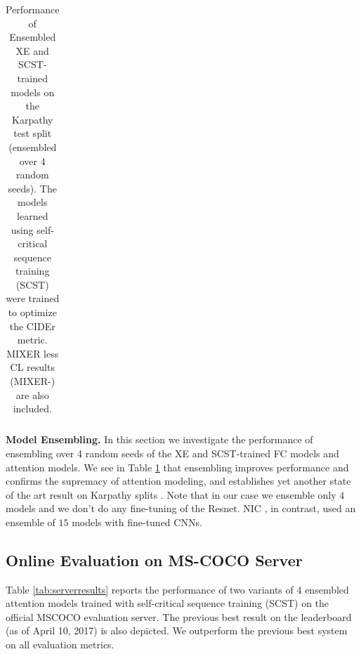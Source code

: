 \documentclass[10pt,twocolumn,letterpaper]{article}
\begin{document}
\begin{table}[t]
\begin{tabular}{l|c|cccc}
\hline
\hline
\end{tabular}
\caption{Performance of Ensembled XE and SCST-trained models on the Karpathy test split (ensembled over 4 random seeds). The models learned using self-critical sequence training (SCST) were trained to optimize the CIDEr metric. MIXER less CL results (MIXER-) are also included.}%
\label{tab:EnsembleFcVsAtt}
\end{table}

\noindent \textbf{Model Ensembling.} In this section we investigate the performance of ensembling over 4 random seeds of the XE and SCST-trained FC models and attention models. We see in Table \ref{tab:EnsembleFcVsAtt} that ensembling improves performance and confirms the supremacy of attention modeling, and establishes yet another state of the art result on Karpathy splits \cite{Karpathy}. Note that in our case we ensemble only $4$ models and we don't do any fine-tuning of the Resnet. NIC \cite{VinyalsTBE16}, in contrast, used an ensemble of $15$ models with fine-tuned CNNs. 

\vspace{-0.00in}
\subsection{Online Evaluation on MS-COCO Server}

Table \ref{tab:serverresults} reports the performance of two variants of 4 ensembled attention models trained with self-critical sequence training (SCST) on the official MSCOCO evaluation server. The previous best result on the leaderboard (as of April 10, 2017) is also depicted. We outperform the previous best system on all evaluation metrics.
\end{document}
